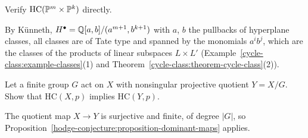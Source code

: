 \begin{exercise}\label{hodge-conjecture:exercise-projective-product}
Verify $\mathrm{HC}(\mathbb{P}^m \times \mathbb{P}^k)$ directly.
\end{exercise}

\begin{solution}
By K\"unneth, $H^\bullet = \mathbb{Q}[a, b]/(a^{m+1}, b^{k+1})$ with $a$, $b$ the pullbacks of hyperplane classes, all classes are of Tate type and spanned by the monomials $a^ib^j$, which are the classes
of the products of linear subspaces $L \times L'$ (Example~\ref{cycle-class:example-classes}(1) and Theorem~\ref{cycle-class:theorem-cycle-class}(2)).
\end{solution}

\begin{exercise}\label{hodge-conjecture:exercise-finite-quotient}
Let a finite group $G$ act on $X$ with nonsingular projective quotient $Y = X/G$. Show that $\mathrm{HC}(X, p)$ implies $\mathrm{HC}(Y, p)$.
\end{exercise}

\begin{solution}
The quotient map $X \to Y$ is surjective and finite, of degree $|G|$, so Proposition~\ref{hodge-conjecture:proposition-dominant-maps} applies.
\end{solution}

